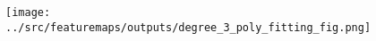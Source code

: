 %
%
\begin{answer}
\begin{figure}[H]
\texttt{[image: ../src/featuremaps/outputs/degree\_3\_poly\_fitting\_fig.png]}
\end{figure}
\end{answer}
%